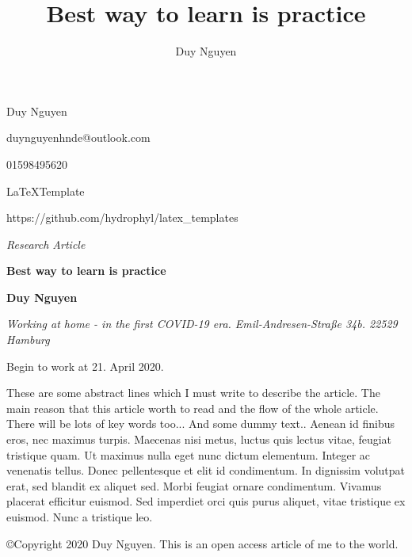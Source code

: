 \documentclass[draft=false
              ,paper=a4
              ,twoside=false
              ,fontsize=10pt
              ,headsepline
              ,BCOR10mm
              ,DIV11
              ]{article}
\title{Best way to learn is practice}
\author{Duy Nguyen}
\begin{document}
\color{smokyblack}

\setlength{\parskip}{1ex}

\small{Duy Nguyen}

\small{duynguyenhnde@outlook.com}

\small{01598495620}

\small{\LaTeX Template}

\small{https://github.com/hydrophyl/latex\_templates}

\vspace{2cm}

\thispagestyle{plain}
\textsf{\textit{\Large{Research Article}}}

\color{arsenic}
\textsf{\textbf{\huge{Best way to learn is practice}}}

\setlength{\parskip}{0.8em}
\color{smokyblack}
\begin{adjustwidth}{3em}{0pt}
\begin{flushleft}
	\textbf{Duy Nguyen}


	\textit{Working at home - in the first COVID-19 era. Emil-Andresen-Stra\ss e 34b. 22529 Hamburg}
		

	Begin to work at 21. April 2020.


	These are some abstract lines which I must write to describe the article. The main reason that this article worth to read and the flow of the whole article. There will be lots of key words too... And some dummy text.. Aenean id finibus eros, nec maximus turpis. Maecenas nisi metus, luctus quis lectus vitae, feugiat tristique quam. Ut maximus nulla eget nunc dictum elementum. Integer ac venenatis tellus. Donec pellentesque et elit id condimentum. In dignissim volutpat erat, sed blandit ex aliquet sed. Morbi feugiat ornare condimentum. Vivamus placerat efficitur euismod. Sed imperdiet orci quis purus aliquet, vitae tristique ex euismod. Nunc a tristique leo.


	\copyright Copyright 2020 Duy Nguyen. This is an open access article of me to the world.
\end{flushleft}
\end{adjustwidth}

{}
{}
{}

\end{document}
